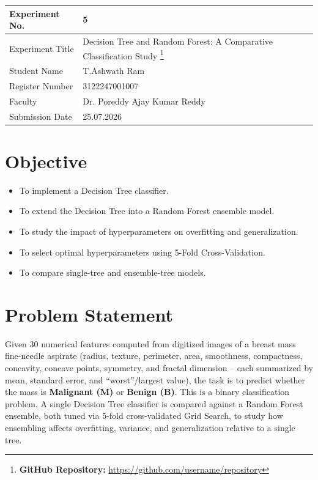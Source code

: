 \documentclass[12pt,a4paper]{article}
\begin{document}
\begin{tabular}{|p{4cm}|p{11cm}|}
\hline
Experiment No. & 5 \\ \hline
Experiment Title & Decision Tree and Random Forest: A Comparative Classification Study
\footnote{\textbf{GitHub Repository: }\url{https://github.com/username/repository}}\\ \hline
Student Name & T.Ashwath Ram\\ \hline
Register Number & 3122247001007\\ \hline
Faculty & Dr. Poreddy Ajay Kumar Reddy \\ \hline
Submission Date & 25.07.2026 \\ \hline
\end{tabular}

\section{Objective}
\begin{itemize}
\item To implement a Decision Tree classifier.
\item To extend the Decision Tree into a Random Forest ensemble model.
\item To study the impact of hyperparameters on overfitting and generalization.
\item To select optimal hyperparameters using 5-Fold Cross-Validation.
\item To compare single-tree and ensemble-tree models.
\end{itemize}

\section{Problem Statement}
Given 30 numerical features computed from digitized images of a breast mass fine-needle
aspirate (radius, texture, perimeter, area, smoothness, compactness, concavity, concave points,
symmetry, and fractal dimension -- each summarized by mean, standard error, and ``worst''/largest
value), the task is to predict whether the mass is \textbf{Malignant (M)} or \textbf{Benign (B)}.
This is a binary classification problem. A single Decision Tree classifier is compared against a
Random Forest ensemble, both tuned via 5-fold cross-validated Grid Search, to study how
ensembling affects overfitting, variance, and generalization relative to a single tree.
\end{document}
